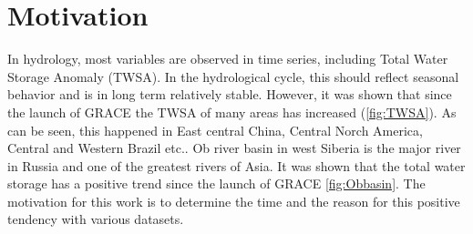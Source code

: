 \section{Motivation}
In hydrology, most variables are observed in time series, including Total Water Storage Anomaly (TWSA). In the hydrological cycle, this should reflect seasonal behavior and is in long term relatively stable. However, it was shown that since the launch of GRACE the TWSA of many areas has increased (\autoref{fig:TWSA}). As can be seen, this happened in East central China, Central Norch America, Central and Western Brazil etc.\cite{rodell2018emerging}. Ob river basin in west Siberia is the major river in Russia and one of the greatest rivers of Asia. It was shown that the total water storage has a positive trend since the launch of GRACE \autoref{fig:Obbasin}. The motivation for this work is to determine the time and the reason for this positive tendency with various datasets. 


